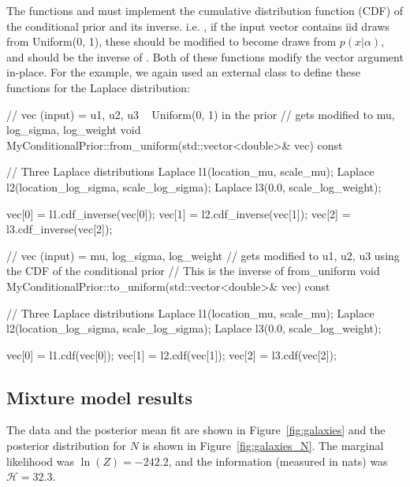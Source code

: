 \documentclass[article, nojss]{jss}
\begin{document}
The functions  and  must implement
the cumulative distribution function (CDF) of the conditional
prior and its inverse. i.e. , if the input vector contains
iid draws from Uniform(0, 1), these should be modified to become draws from
$p(x|\alpha)$, and  should be the inverse of
.
Both of these functions modify the vector argument in-place.
For the example, we again used an external class to define these functions
for the Laplace distribution:

\begin{CodeChunk}
\begin{CodeInput}
// vec (input) = {u1, u2, u3} ~ Uniform(0, 1) in the prior
// gets modified to {mu, log_sigma, log_weight}
void MyConditionalPrior::from_uniform(std::vector<double>& vec) const
{
    // Three Laplace distributions
    Laplace l1(location_mu, scale_mu);
    Laplace l2(location_log_sigma, scale_log_sigma);
    Laplace l3(0.0, scale_log_weight);

    vec[0] = l1.cdf_inverse(vec[0]);
    vec[1] = l2.cdf_inverse(vec[1]);
    vec[2] = l3.cdf_inverse(vec[2]);
}

// vec (input) = {mu, log_sigma, log_weight}
// gets modified to {u1, u2, u3} using the CDF of the conditional prior
// This is the inverse of from_uniform
void MyConditionalPrior::to_uniform(std::vector<double>& vec) const
{
    // Three Laplace distributions
    Laplace l1(location_mu, scale_mu);
    Laplace l2(location_log_sigma, scale_log_sigma);
    Laplace l3(0.0, scale_log_weight);

    vec[0] = l1.cdf(vec[0]);
    vec[1] = l2.cdf(vec[1]);
    vec[2] = l3.cdf(vec[2]);
}
\end{CodeInput}
\end{CodeChunk}

\subsection{Mixture model results}
The data and the posterior mean fit are shown
in Figure~\ref{fig:galaxies} and the posterior distribution for
$N$ is shown in Figure~\ref{fig:galaxies_N}.
The marginal likelihood was $\ln(Z) = -242.2$, and
the information (measured in nats) was $\mathcal{H} = 32.3$.
\end{document}
